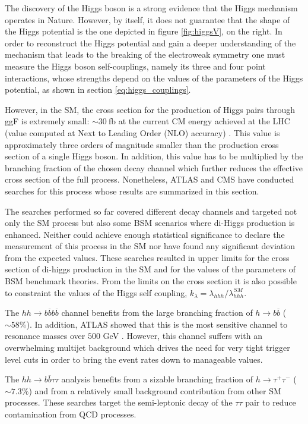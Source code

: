 The discovery of the Higgs boson is a strong evidence that the Higgs mechanism operates in Nature. However, by itself, it does not guarantee that the shape of the Higgs potential is the one depicted in figure \ref{fig:higgsV}, on the right. In order to reconstruct the Higgs potential and gain a deeper understanding of the mechanism that leads to the breaking of the electroweak symmetry one must measure the Higgs boson self-couplings, namely its three and four point interactions, whose strengths depend on the values of the parameters of the Higgs potential, as shown in section \ref{eq:higgs_couplings}.  

However, in the SM, the cross section for the production of Higgs pairs through ggF is extremely small: $\sim30~$fb at the current CM energy achieved at the LHC (value computed at Next to Leading Order (NLO) accuracy) \cite{higgsCrossSection}. This value is approximately three orders of magnitude smaller than the production cross section of a single Higgs boson. In addition, this value has to be multiplied by the branching fraction of the chosen decay channel which further reduces the effective cross section of the full process. Nonetheless, ATLAS and CMS have conducted searches for this process whose results are summarized in this section.

The searches performed so far covered different decay channels and targeted not only the SM process but also some BSM scenarios where di-Higgs production is enhanced. Neither could achieve enough statistical significance to declare the measurement of this process in the SM nor have found any significant deviation from the expected values. These searches resulted in upper limits for the cross section of di-higgs production in the SM and for the values of the parameters of BSM benchmark theories. From the limits on the cross section it is also possible to constraint the values of the Higgs self coupling, $k_{\lambda}=\lambda_{hhh}/\lambda_{hhh}^{SM}$.

The $hh\rightarrow b\overline{b}b\overline{b}$ channel \cite{hh2bbbbATLAS,hh2bbbbCMS} benefits from the large branching fraction of $h\rightarrow b\overline{b}$ ($\sim 58 \%$). In addition, ATLAS showed that this is the most sensitive channel to resonance masses over $500$ GeV \cite{hhATLAS}. However, this channel suffers with an overwhelming multijet background which drives the need for very tight trigger level cuts in order to bring the event rates down to manageable values.

The $hh\rightarrow b\overline{b}\tau\tau$ analysis \cite{hhbbtautau_CMS,ATLAShh2tautau} benefits from a sizable branching fraction of $h\rightarrow\tau^+\tau^-$ ($\sim 7.3\%$) and from a relatively small background contribution from other SM processes. These searches target the semi-leptonic decay of the $\tau\tau$ pair to reduce contamination from QCD processes.

